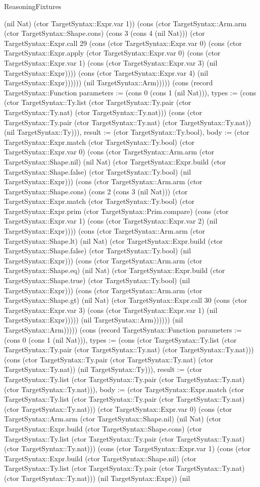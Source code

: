 \begin{lexlean}{ReasoningFixtures}
\begin{semanticmodule}
{(nil Nat) (ctor TargetSyntax::Expr.var 1)) (cons (ctor TargetSyntax::Arm.arm (ctor TargetSyntax::Shape.cons) (cons 3 (cons 4 (nil Nat))) (ctor TargetSyntax::Expr.call 29 (cons (ctor TargetSyntax::Expr.var 0) (cons (ctor TargetSyntax::Expr.apply (ctor TargetSyntax::Expr.var 0) (cons (ctor TargetSyntax::Expr.var 1) (cons (ctor TargetSyntax::Expr.var 3) (nil TargetSyntax::Expr)))) (cons (ctor TargetSyntax::Expr.var 4) (nil TargetSyntax::Expr)))))) (nil TargetSyntax::Arm))))}) (cons (record TargetSyntax::Function {parameters := (cons 0 (cons 1 (nil Nat))), types := (cons (ctor TargetSyntax::Ty.list (ctor TargetSyntax::Ty.pair (ctor TargetSyntax::Ty.nat) (ctor TargetSyntax::Ty.nat))) (cons (ctor TargetSyntax::Ty.pair (ctor TargetSyntax::Ty.nat) (ctor TargetSyntax::Ty.nat)) (nil TargetSyntax::Ty))), result := (ctor TargetSyntax::Ty.bool), body := (ctor TargetSyntax::Expr.match (ctor TargetSyntax::Ty.bool) (ctor TargetSyntax::Expr.var 0) (cons (ctor TargetSyntax::Arm.arm (ctor TargetSyntax::Shape.nil) (nil Nat) (ctor TargetSyntax::Expr.build (ctor TargetSyntax::Shape.false) (ctor TargetSyntax::Ty.bool) (nil TargetSyntax::Expr))) (cons (ctor TargetSyntax::Arm.arm (ctor TargetSyntax::Shape.cons) (cons 2 (cons 3 (nil Nat))) (ctor TargetSyntax::Expr.match (ctor TargetSyntax::Ty.bool) (ctor TargetSyntax::Expr.prim (ctor TargetSyntax::Prim.compare) (cons (ctor TargetSyntax::Expr.var 1) (cons (ctor TargetSyntax::Expr.var 2) (nil TargetSyntax::Expr)))) (cons (ctor TargetSyntax::Arm.arm (ctor TargetSyntax::Shape.lt) (nil Nat) (ctor TargetSyntax::Expr.build (ctor TargetSyntax::Shape.false) (ctor TargetSyntax::Ty.bool) (nil TargetSyntax::Expr))) (cons (ctor TargetSyntax::Arm.arm (ctor TargetSyntax::Shape.eq) (nil Nat) (ctor TargetSyntax::Expr.build (ctor TargetSyntax::Shape.true) (ctor TargetSyntax::Ty.bool) (nil TargetSyntax::Expr))) (cons (ctor TargetSyntax::Arm.arm (ctor TargetSyntax::Shape.gt) (nil Nat) (ctor TargetSyntax::Expr.call 30 (cons (ctor TargetSyntax::Expr.var 3) (cons (ctor TargetSyntax::Expr.var 1) (nil TargetSyntax::Expr))))) (nil TargetSyntax::Arm)))))) (nil TargetSyntax::Arm))))}) (cons (record TargetSyntax::Function {parameters := (cons 0 (cons 1 (nil Nat))), types := (cons (ctor TargetSyntax::Ty.list (ctor TargetSyntax::Ty.pair (ctor TargetSyntax::Ty.nat) (ctor TargetSyntax::Ty.nat))) (cons (ctor TargetSyntax::Ty.pair (ctor TargetSyntax::Ty.nat) (ctor TargetSyntax::Ty.nat)) (nil TargetSyntax::Ty))), result := (ctor TargetSyntax::Ty.list (ctor TargetSyntax::Ty.pair (ctor TargetSyntax::Ty.nat) (ctor TargetSyntax::Ty.nat))), body := (ctor TargetSyntax::Expr.match (ctor TargetSyntax::Ty.list (ctor TargetSyntax::Ty.pair (ctor TargetSyntax::Ty.nat) (ctor TargetSyntax::Ty.nat))) (ctor TargetSyntax::Expr.var 0) (cons (ctor TargetSyntax::Arm.arm (ctor TargetSyntax::Shape.nil) (nil Nat) (ctor TargetSyntax::Expr.build (ctor TargetSyntax::Shape.cons) (ctor TargetSyntax::Ty.list (ctor TargetSyntax::Ty.pair (ctor TargetSyntax::Ty.nat) (ctor TargetSyntax::Ty.nat))) (cons (ctor TargetSyntax::Expr.var 1) (cons (ctor TargetSyntax::Expr.build (ctor TargetSyntax::Shape.nil) (ctor TargetSyntax::Ty.list (ctor TargetSyntax::Ty.pair (ctor TargetSyntax::Ty.nat) (ctor TargetSyntax::Ty.nat))) (nil TargetSyntax::Expr)) (nil }
\end{semanticmodule}
\end{lexlean}
